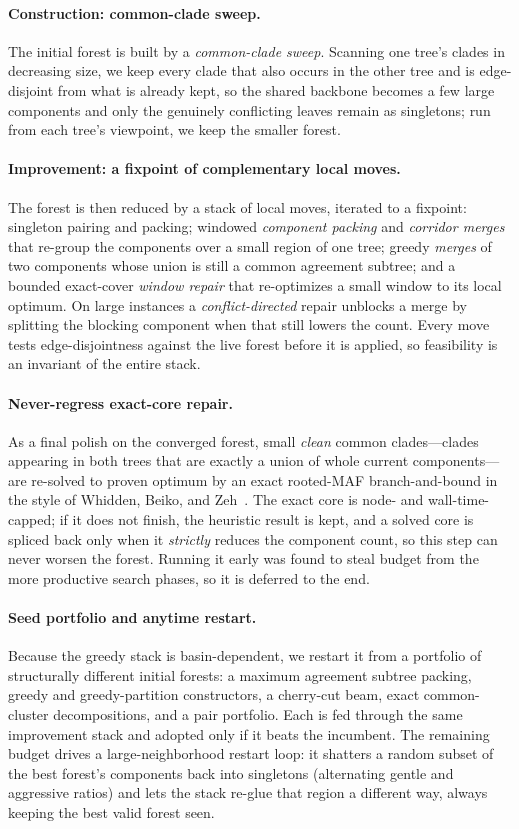 \documentclass[a4paper,UStitle,numberwithinsect=false,autoref]{lipics-v2021}
\begin{document}
\paragraph{Construction: common-clade sweep.} The initial forest is built by a
\emph{common-clade sweep}. Scanning one tree's clades in decreasing size, we keep every
clade that also occurs in the other tree and is edge-disjoint from what is already
kept, so the shared backbone becomes a few large components and only the genuinely
conflicting leaves remain as singletons; run from each tree's viewpoint, we keep the
smaller forest.

\paragraph{Improvement: a fixpoint of complementary local moves.} The forest is then
reduced by a stack of local moves, iterated to a fixpoint: singleton pairing and
packing; windowed \emph{component packing} and \emph{corridor merges} that re-group the
components over a small region of one tree; greedy \emph{merges} of two components whose
union is still a common agreement subtree; and a bounded exact-cover \emph{window
repair} that re-optimizes a small window to its local optimum. On large instances a
\emph{conflict-directed} repair unblocks a merge by splitting the blocking component
when that still lowers the count. Every move tests edge-disjointness against the live
forest before it is applied,
so feasibility is an invariant of the entire stack.

\paragraph{Never-regress exact-core repair.} As a final polish on the converged forest,
small \emph{clean} common clades---clades appearing in both trees that are exactly a
union of whole current components---are re-solved to proven optimum by an exact
rooted-MAF branch-and-bound in the style of Whidden, Beiko, and
Zeh~\cite{WhiddenBeikoZeh2013}. The exact core is node- and wall-time-capped; if it does
not finish, the heuristic result is kept, and a solved core is spliced back only when it
\emph{strictly} reduces the component count, so this step can never worsen the forest. Running it early was found to steal
budget from the more productive search phases, so it is deferred to the end.

\paragraph{Seed portfolio and anytime restart.} Because the greedy stack is
basin-dependent, we restart it from a portfolio of structurally different initial
forests: a maximum agreement subtree packing, greedy and greedy-partition
constructors, a cherry-cut beam, exact common-cluster decompositions, and a pair
portfolio. Each is fed through the same improvement stack and adopted only if it beats
the incumbent. The remaining budget drives a large-neighborhood restart loop: it
shatters a random subset of the best forest's components back into singletons
(alternating gentle and aggressive ratios) and lets the stack re-glue that region a
different way, always keeping the best valid forest seen.
\end{document}
